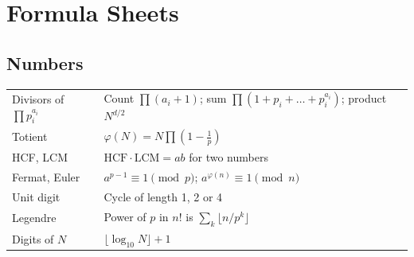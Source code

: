 \documentclass[11pt,a4paper,openany]{report}
\begin{document}
\chapter{Formula Sheets}\label{ch:sheet}
\small
\section*{Numbers}
\begin{tabular}{>{\raggedright}p{5.4cm}>{\raggedright\arraybackslash}p{9.6cm}}
\toprule
Divisors of $\prod p_i^{a_i}$ & Count $\prod(a_i+1)$; sum $\prod(1+p_i+\dots+p_i^{a_i})$; product $N^{d/2}$\\
Totient & $\varphi(N)=N\prod(1-\frac1p)$\\
HCF, LCM & $\text{HCF}\cdot\text{LCM}=ab$ for two numbers\\
Fermat, Euler & $a^{p-1}\equiv1\pmod p$; $a^{\varphi(n)}\equiv1\pmod n$\\
Unit digit & Cycle of length 1, 2 or 4\\
Legendre & Power of $p$ in $n!$ is $\sum_k\lfloor n/p^k\rfloor$\\
Digits of $N$ & $\lfloor\log_{10}N\rfloor+1$\\
\bottomrule
\end{tabular}
\end{document}
